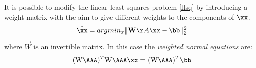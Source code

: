 It is possible to modify the linear least squares problem \eqref{llsq} by introducing a weight matrix with the aim to give different weights to the components of $\xx$. 
\begin{equation}
   \hat{\xx}= argmin_x \|\vec{W} \AA \xx-\bb\|_2^2
   \label{wllsq}
\end{equation}
where $\vec{W}$ is an invertible matrix. In this case the \textit{weighted normal equations} are:
$$(\mat{W}\AAA)^T\mat{W}\AAA \xx=(\mat{W}\AAA)^T \bb$$


